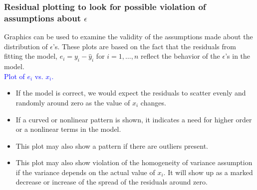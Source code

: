 \documentclass[xcolor=dvipsnames,12pt]{beamer}
\begin{document}
\begin{frame}
\frametitle{Residual plotting to look for possible violation of assumptions
about {\boldmath$\epsilon$}}
Graphics can be used to examine the validity of the assumptions made about
the distribution of $\epsilon$'s. These plots are based on the fact that the residuals from fitting the model, $e_i=y_i - \hat{y}_i$ for $i=1,\ldots,n$
reflect the behavior of the  $\epsilon$'s in the model.\\[.05in]
{\textcolor{blue}{Plot of {\boldmath$e_i$} vs. {\boldmath$x_i$}.}} \\[.01in] 
\begin{itemize}
\item If the model is correct, we would expect the residuals to
scatter evenly and randomly around zero as the value of  $x_i$
changes. \\[.01in]
\item If a curved or nonlinear pattern is 
shown, it indicates a need for higher order or a nonlinear 
terms in the model.
\end{itemize}
\end{frame}




\begin{frame}
\begin{itemize}
\item This plot may also show a pattern if there are 
outliers present. \\[.1in]
\item This plot may also show violation of the
homogeneity of variance  assumption if the variance depends on the actual value
of $x_i$. It will show up as  a marked decrease or increase of the spread of the 
residuals around zero.\\[.1in]
\end{itemize}
\end{frame}
\end{document}
